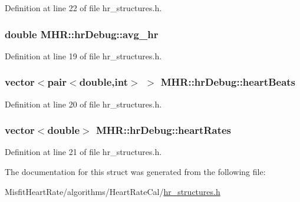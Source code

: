 Definition at line 22 of file hr\+\_\+structures.\+h.

\hypertarget{struct_m_h_r_1_1hr_debug_ab0a19a437cbd96f0af5d1b41114c1b80}{
\subsubsection[{avg\+\_\+hr}]{\setlength{\rightskip}{0pt plus 5cm}double M\+H\+R\+::hr\+Debug\+::avg\+\_\+hr}}\label{struct_m_h_r_1_1hr_debug_ab0a19a437cbd96f0af5d1b41114c1b80}


Definition at line 19 of file hr\+\_\+structures.\+h.

\hypertarget{struct_m_h_r_1_1hr_debug_aecd197b08db2c97469bc1d99af93a559}{
\subsubsection[{heart\+Beats}]{\setlength{\rightskip}{0pt plus 5cm}vector$<$pair$<$double,int$>$ $>$ M\+H\+R\+::hr\+Debug\+::heart\+Beats}}\label{struct_m_h_r_1_1hr_debug_aecd197b08db2c97469bc1d99af93a559}


Definition at line 20 of file hr\+\_\+structures.\+h.

\hypertarget{struct_m_h_r_1_1hr_debug_a019b377c2e1d3ade917074967cf20504}{
\subsubsection[{heart\+Rates}]{\setlength{\rightskip}{0pt plus 5cm}vector$<$double$>$ M\+H\+R\+::hr\+Debug\+::heart\+Rates}}\label{struct_m_h_r_1_1hr_debug_a019b377c2e1d3ade917074967cf20504}


Definition at line 21 of file hr\+\_\+structures.\+h.



The documentation for this struct was generated from the following file\+:\begin{DoxyCompactItemize}
\item 
Misfit\+Heart\+Rate/algorithms/\+Heart\+Rate\+Cal/\hyperlink{hr__structures_8h}{hr\+\_\+structures.\+h}\end{DoxyCompactItemize}
